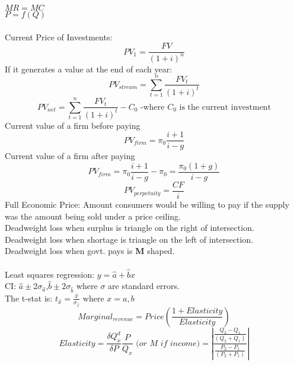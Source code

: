 \documentclass[nobib,fleqn,8pt]{article}
\begin{document}
$MR=MC$\\
$P=f(Q)$\\~\\
Current Price of Investments:
\begin{equation*}
    PV_1 = \frac{FV}{(1+i)^n}
\end{equation*}
If it generates a value at the end of each year:
\begin{equation*}
    PV_{stream} = \sum_{t=1}^n\frac{FV_t}{(1+i)^t}
\end{equation*}
\begin{equation*}
    PV_{net} = \sum_{t=1}^n\frac{FV_t}{(1+i)^t}-C_0 \text{ -where $C_0$ is the current investment}
\end{equation*}
Current value of a firm before paying
\begin{equation*}
    PV_{firm} = \pi_0\frac{i+1}{i-g}
\end{equation*}
Current value of a firm after paying
\begin{equation*}
    PV_{firm} = \pi_0\frac{i+1}{i-g} - \pi_0 = \frac{\pi_0(1+g)}{i-g}
\end{equation*}
\begin{equation*}
    PV_{perpetuity} = \frac{CF}{i}
\end{equation*}
Full Economic Price: Amount consumers would be willing to pay if the supply was the amount being sold under a price ceiling.\\
Deadweight loss when surplus is triangle on the right of intersection.\\
Deadweight loss when shortage is triangle on the left of intersection.\\
Deadweight loss when govt. pays is \textbf{M} shaped.\\~\\
Least squares regression: $y=\hat{a}+\hat{b}x$\\
CI: $\hat{a}\pm 2\sigma_{\hat{a}}$,$\hat{b}\pm 2\sigma_{\hat{b}}$ where $\sigma$ are standard errors.\\
The t-stat is: $t_{\hat{x}}=\frac{\hat{x}}{\sigma_{\hat{x}}}$ where $x=a,b$\\
\begin{equation*}
    Marginal_{revenue} = Price\left(\frac{1+Elasticity}{Elasticity}\right)
\end{equation*}
\begin{equation*}
    Elasticity = \frac{\delta Q_x^d}{\delta P} \frac{P}{Q_x} \textit{ (or M if income)} = \left\vert \frac{\frac{Q_2-Q_1}{(Q_2+Q_1)}}{\frac{P_2-P_1}{(P_2+P_1)}}\right\vert
\end{equation*}
\end{document}
